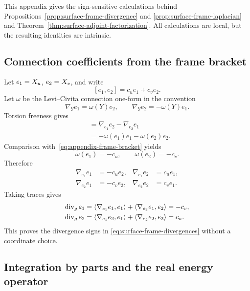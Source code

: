 This appendix gives the sign-sensitive calculations behind
Propositions~\ref{prop:surface-frame-divergence} and
\ref{prop:surface-frame-laplacian} and
Theorem~\ref{thm:surface-adjoint-factorization}.  All calculations are local, but the
resulting identities are intrinsic.

\subsection{Connection coefficients from the frame bracket}

Let $e_1=X_u$, $e_2=X_v$, and write
\begin{equation}\label{eq:appendix-frame-bracket}
 [e_1,e_2]=c_ue_1+c_ve_2.
\end{equation}
Let $\omega$ be the Levi--Civita connection one-form in the convention
\begin{equation}\label{eq:appendix-connection-form-convention}
 \nabla_Ye_1=\omega(Y)e_2,
 \qquad
 \nabla_Ye_2=-\omega(Y)e_1.
\end{equation}
Torsion freeness gives
\begin{align*}
 [e_1,e_2]
 &=\nabla_{e_1}e_2-\nabla_{e_2}e_1\\
 &=-\omega(e_1)e_1-\omega(e_2)e_2.
\end{align*}
Comparison with~\eqref{eq:appendix-frame-bracket} yields
\begin{equation}\label{eq:appendix-connection-structure-coefficients}
 \omega(e_1)=-c_u,
 \qquad
 \omega(e_2)=-c_v.
\end{equation}
Therefore
\begin{align}
 \nabla_{e_1}e_1&=-c_u e_2,
 &\nabla_{e_1}e_2&=c_u e_1,
 \label{eq:appendix-connection-first-row}\\
 \nabla_{e_2}e_1&=-c_v e_2,
 &\nabla_{e_2}e_2&=c_v e_1.
 \label{eq:appendix-connection-second-row}
\end{align}
Taking traces gives
\begin{align*}
 \operatorname{div}_ge_1
 &=\langle\nabla_{e_1}e_1,e_1\rangle
   +\langle\nabla_{e_2}e_1,e_2\rangle
 =-c_v,\\
 \operatorname{div}_ge_2
 &=\langle\nabla_{e_1}e_2,e_1\rangle
   +\langle\nabla_{e_2}e_2,e_2\rangle
 =c_u.
\end{align*}
This proves the divergence signs in
\eqref{eq:surface-frame-divergences} without a coordinate choice.

\subsection{Integration by parts and the real energy operator}


